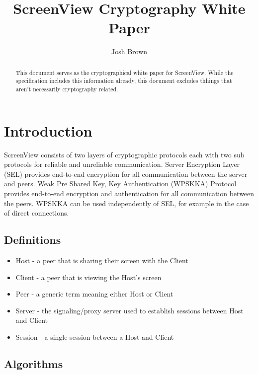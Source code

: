 \documentclass{article}
\title{\textbf{ScreenView Cryptography White Paper}}
\author{Josh Brown}
\date{}
\begin{document}
    \maketitle

    \begin{abstract}
        This document serves as the cryptographical white paper for ScreenView.
        While the specification includes this information already, this document excludes thhings that aren't
        necessarily cryptography related.
    \end{abstract}

    \newpage


    \section{Introduction}

    ScreenView consists of two layers of cryptographic protocols each with two sub protocols for reliable and unreliable communication.
    Server Encryption Layer (SEL) provides end-to-end encryption for all communication between the server and peers.
    Weak Pre Shared Key, Key Authentication (WPSKKA) Protocol provides end-to-end encryption and authentication for
    all communication between the peers.
    WPSKKA can be used independently of SEL, for example in the case of direct connections.

    \subsection{Definitions}

    \begin{itemize}
        \item Host - a peer that is sharing their screen with the Client
        \item Client - a peer that is viewing the Host's screen
        \item Peer - a generic term meaning either Host or Client
        \item Server - the signaling/proxy server used to establish sessions between Host and Client
        \item Session - a single session between a Host and Client
    \end{itemize}

    \subsection{Algorithms}
\end{document}
